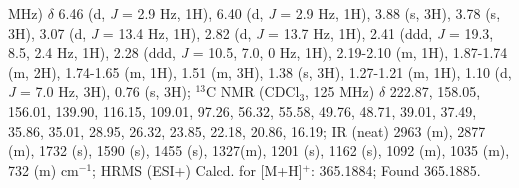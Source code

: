 MHz) $\delta$ 6.46 (d, \textit{J} = 2.9 Hz, 1H), 6.40 (d, \textit{J} = 2.9 Hz, 1H), 3.88 (s, 3H),
3.78 (s, 3H), 3.07 (d, \textit{J} = 13.4 Hz, 1H), 2.82 (d, \textit{J} = 13.7 Hz, 1H), 2.41
(ddd, \textit{J} = 19.3, 8.5, 2.4 Hz, 1H), 2.28 (ddd, \textit{J} = 10.5, 7.0, 0 Hz, 1H), 2.19-2.10 (m, 1H), 1.87-1.74
(m, 2H), 1.74-1.65 (m, 1H), 1.51 (m, 3H), 1.38 (s, 3H), 1.27-1.21 (m, 1H), 1.10 (d, \textit{J} = 7.0 Hz, 3H), 0.76 (s, 3H); $^{13}$C NMR (CDCl$_3$, 125 MHz) $\delta$ 222.87, 158.05, 156.01, 139.90, 116.15,
109.01, 97.26, 56.32, 55.58, 49.76, 48.71, 39.01, 37.49, 35.86, 35.01, 28.95, 26.32, 23.85, 22.18,
20.86, 16.19; IR (neat) 2963 (m), 2877 (m), 1732 (s), 1590 (s), 1455 (s), 1327(m), 1201 (s), 1162
(s), 1092 (m), 1035 (m), 732 (m) cm$^{-1}$; HRMS (ESI+) Calcd. for  [M+H]$^+$: 365.1884;
Found 365.1885.

